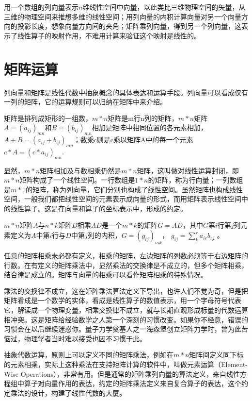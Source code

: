 用一个数组的列向量表示$ n $维线性空间中向量，以此类比三维物理空间的矢量，从三维的物理空间来推想多维的线性空间；用列向量的内积计算向量对另一个向量方向的投影长度，想象向量方向间的夹角；矩阵乘列向量，得到另一个列向量，这表示了线性算子的映射作用，不难用计算来验证这个映射是线性的。

\section{矩阵运算}
列向量和矩阵是线性代数中抽象概念的具体表达和运算手段。列向量可以看成仅有一列的矩阵，它的运算规则可以归纳在矩阵中来介绍。

矩阵是排列成矩形的一组数，$ m*n $矩阵是m行n列的矩阵，$ m*n $矩阵$ A=(a_{ij})_{mn} $和$ B=(b_{ij})_{mn} $相加是矩阵中相同位置的各元素相加，$ A+B=(a_{ij}+b_{ij})_{mn} $；数乘c则是c乘以矩阵A中的每一个元素$ c*A=(c*a_{ij})_{mn} $.

显然，$ m*n $矩阵相加及与数相乘仍然是$ m*n $矩阵，这叫做对线性运算封闭，即$ m*n $矩阵构成了一个线性空间。一行数组是$ 1*n $的矩阵，称为行向量；一列数组是$ m*1 $的矩阵，称为列向量，它们分别也构成了线性空间。虽然矩阵也构成线性空间，一般我们都把线性空间的元素表示成向量的形式，而用矩阵表示线性空间中的线性算子。这是在向量和算子的坐标表示中，形成的约定。

$ m*n $矩阵$ A $与$ n*k $矩阵$ D $相乘$ AD $是一个$ m*k $的矩阵$ G=AD $，其中$ G $第$ i $行第$ j $列元素定义为$ A $中第$ i $行与$ D $中第$ j $列的内积，$ G=(g_{ij})_{mk} $， $ g_{ij}= \sum_{k}^{r}a_{ir}b_{rj} $ 。

任意的矩阵相乘未必都有定义，相乘的矩阵，左边矩阵的列数必须等于右边矩阵的行数。在有定义的矩阵乘法中，显然乘法的交换律是不成立的，但多个矩阵相乘，结合律是成立的。矩阵与向量的相乘可以看作矩阵相乘的特殊情况。

乘法的交换律不成立，这在矩阵乘法算法定义下导出，也许人们不觉为奇，但是把矩阵看成是一个数学的实体，看成是线性算子的数值表示，用一个字母符号代表它，解读成一个物理变量，相乘交换律不成立，就与长期直观形成标量的代数运算相冲突。这是矩阵给经验数学之人第一个深刻的习惯改变。如果你不经意，错误的习惯会在以后继续迷惑你。量子力学奠基人之一海森堡创立矩阵力学时，曾为此苦恼过，物理学者当时难以接受也因不习惯于此。

抽象代数运算，原则上可以定义不同的矩阵乘法，例如在$ m*n $矩阵间定义同下标的元素相乘，实际上这种乘法在支持矩阵计算的软件中，叫做元素运算（Element-Wise Operations），非常有用。但是通常的矩阵乘列向量的算法定义，来自线性方程组中算子对向量作用的表达，约定的矩阵乘法定义来自复合算子的表达，这个约定乘法的设计，构建了线性代数的大厦。

